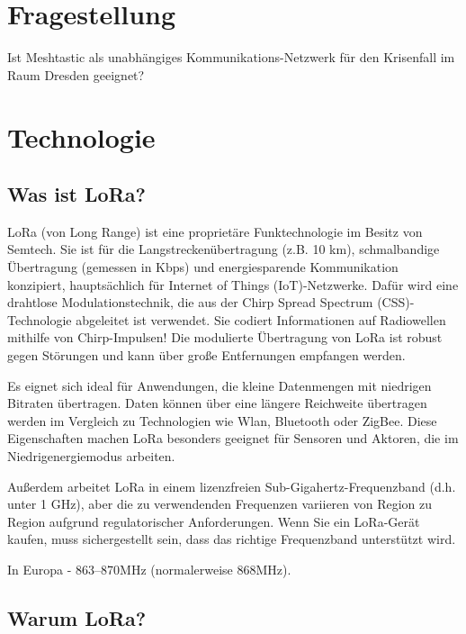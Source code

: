 \documentclass[12pt,a4paper]{article}
\begin{document}
\section{Fragestellung}

Ist Meshtastic als unabhängiges Kommunikations-Netzwerk für den Krisenfall im Raum Dresden geeignet?

\section{Technologie}
\subsection{Was ist LoRa?}

LoRa (von Long Range) ist eine proprietäre Funktechnologie im Besitz von Semtech. Sie ist für die Langstreckenübertragung (z.B. 10 km), schmalbandige Übertragung (gemessen in Kbps) und energiesparende Kommunikation konzipiert, hauptsächlich für Internet of Things (IoT)-Netzwerke. Dafür wird eine drahtlose Modulationstechnik, die aus der Chirp Spread Spectrum (CSS)-Technologie abgeleitet ist verwendet. Sie codiert Informationen auf Radiowellen mithilfe von Chirp-Impulsen! Die modulierte Übertragung von LoRa ist robust gegen Störungen und kann über große Entfernungen empfangen werden.

Es eignet sich ideal für Anwendungen, die kleine Datenmengen mit niedrigen Bitraten übertragen. Daten können über eine längere Reichweite übertragen werden im Vergleich zu Technologien wie Wlan, Bluetooth oder ZigBee. Diese Eigenschaften machen LoRa besonders geeignet für Sensoren und Aktoren, die im Niedrigenergiemodus arbeiten.

Außerdem arbeitet LoRa in einem lizenzfreien Sub-Gigahertz-Frequenzband (d.h. unter 1 GHz), aber die zu verwendenden Frequenzen variieren von Region zu Region aufgrund regulatorischer Anforderungen. Wenn Sie ein LoRa-Gerät kaufen, muss sichergestellt sein, dass das richtige Frequenzband unterstützt wird.

In Europa - 863–870MHz (normalerweise 868MHz).

\subsection{Warum LoRa?}
\end{document}
